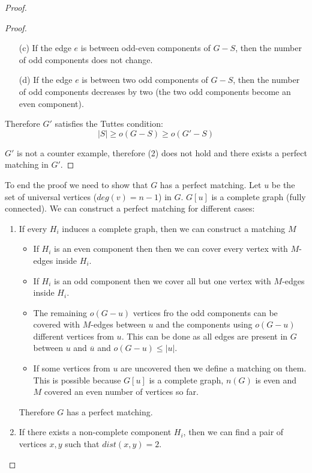 \documentclass[notitlepage, 12pt]{article}
\begin{document}
\begin{proof}
\begin{itemize}
\begin{proof}
\begin{itemize}
\begin{itemize}
          \item[(c)] If the edge $e$ is between odd-even components of $G-S$, then the number of odd components
          does not change.
          \item[(d)] If the edge $e$ is between two odd components of $G-S$, then the number of odd components
          decreases by two (the two odd components become an even component).
        \end{itemize}
        Therefore $G'$ satisfies the Tuttes condition:
        \[|S| \geq o(G-S) \geq o(G'- S)\]
      \end{itemize}
      $G'$ is not a counter example, therefore (2) does not hold and there exists a perfect matching in $G'$.
    \end{proof}
    To end the proof we need to show that $G$ has a perfect matching. Let $u$ be the set of
    universal vertices ($deg(v) = n-1$) in $G$. $G[u]$ is a complete graph (fully connected).
    We can construct a perfect matching for different cases:
    \begin{enumerate}
      \item If every $H_i$ induces a complete graph, then we can construct a matching $M$
      \begin{itemize}
        \item If $H_i$ is an even component then then we can cover every vertex with $M$-edges inside $H_i$.
        \item If $H_i$ is an odd component then we cover all but one vertex with $M$-edges inside $H_i$.
        \item The remaining $o(G-u)$ vertices fro the odd components can be covered with $M$-edges between $u$
        and the components using $o(G-u)$ different vertices from $u$. This can be done as all edges are present
        in $G$ between $u$ and $\overline{u}$ and $o(G-u) \leq |u|$.
        \item If some vertices from $u$ are uncovered then we define a matching on them. This is possible
        because $G[u]$ is a complete graph, $n(G)$ is even and $M$ covered an even number of vertices so far.
      \end{itemize}
      Therefore $G$ has a perfect matching.

      \item If there exists a non-complete component $H_i$, then we can find a pair of vertices $x,y$ such that
      $dist(x,y) = 2$.

      \begin{center}
        \begin{tikzpicture}


\end{tikzpicture}
\end{center}
\end{enumerate}
\end{itemize}
\end{proof}
\end{document}
